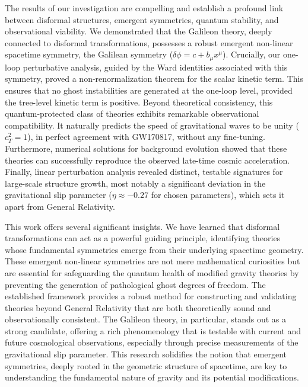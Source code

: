 \documentclass[twocolumn]{aastex631}
\begin{document}
The results of our investigation are compelling and establish a profound link between disformal structures, emergent symmetries, quantum stability, and observational viability. We demonstrated that the Galileon theory, deeply connected to disformal transformations, possesses a robust emergent non-linear spacetime symmetry, the Galilean symmetry ($\delta\phi = c + b_\mu x^\mu$). Crucially, our one-loop perturbative analysis, guided by the Ward identities associated with this symmetry, proved a non-renormalization theorem for the scalar kinetic term. This ensures that no ghost instabilities are generated at the one-loop level, provided the tree-level kinetic term is positive. Beyond theoretical consistency, this quantum-protected class of theories exhibits remarkable observational compatibility. It naturally predicts the speed of gravitational waves to be unity ($c_T^2=1$), in perfect agreement with GW170817, without any fine-tuning. Furthermore, numerical solutions for background evolution showed that these theories can successfully reproduce the observed late-time cosmic acceleration. Finally, linear perturbation analysis revealed distinct, testable signatures for large-scale structure growth, most notably a significant deviation in the gravitational slip parameter ($\eta \approx -0.27$ for chosen parameters), which sets it apart from General Relativity.

This work offers several significant insights. We have learned that disformal transformations can act as a powerful guiding principle, identifying theories whose fundamental symmetries emerge from their underlying spacetime geometry. These emergent non-linear symmetries are not mere mathematical curiosities but are essential for safeguarding the quantum health of modified gravity theories by preventing the generation of pathological ghost degrees of freedom. The established framework provides a robust method for constructing and validating theories beyond General Relativity that are both theoretically sound and observationally consistent. The Galileon theory, in particular, stands out as a strong candidate, offering a rich phenomenology that is testable with current and future cosmological observations, especially through precise measurements of the gravitational slip parameter. This research solidifies the notion that emergent symmetries, deeply rooted in the geometric structure of spacetime, are key to understanding the fundamental nature of gravity and its potential modifications.
\end{document}
